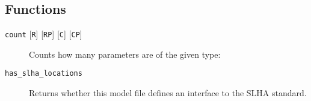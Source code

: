 \documentclass[11pt,a4paper]{refrep}
\begin{document}
\subsection{Functions}
\begin{description}
\item[\texttt{count}
   {[\texttt{R}]}
   {[\texttt{RP}]}
   {[\texttt{C}]}
   {[\texttt{CP}]}
] Counts how many parameters are of the given type:
\item[\texttt{has\_slha\_locations}] Returns whether this model file
   defines an interface to the SLHA standard.
\end{description}
\end{document}
